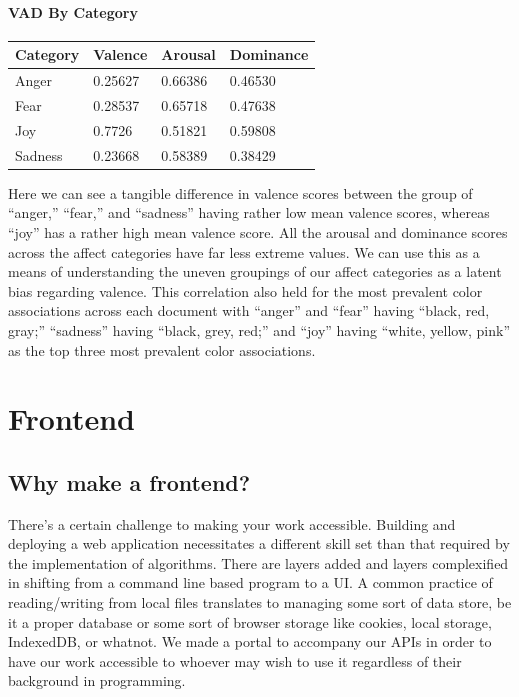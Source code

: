 \documentclass[11pt, twoside, reqno]{book}
\begin{document}
\subsubsection{\textbf{VAD By Category}}

\begin{table}[h!]
    \raggedright
    \begin{tabular}{|l|l|l|l|}
    \hline
        Category & Valence & Arousal & Dominance \\ \hline
        Anger & 0.25627 & 0.66386 & 0.46530 \\ \hline
        Fear & 0.28537 & 0.65718 & 0.47638 \\ \hline
        Joy & 0.7726 & 0.51821 & 0.59808 \\ \hline
        Sadness & 0.23668 & 0.58389 & 0.38429 \\ \hline
    \end{tabular}
\end{table}

Here we can see a tangible difference in valence scores between the group of ``anger,'' ``fear,'' and ``sadness'' having rather low mean valence scores, whereas ``joy'' has a rather high mean valence score. All the arousal and dominance scores across the affect categories have far less extreme values. We can use this as a means of understanding the uneven groupings of our affect categories as a latent bias regarding valence. This correlation also held for the most prevalent color associations across each document with ``anger'' and ``fear'' having ``black, red, gray;'' ``sadness'' having ``black, grey, red;'' and ``joy'' having ``white, yellow, pink'' as the top three most prevalent color associations.









\chapter{Frontend}

\section{Why make a frontend?}

There's a certain challenge to making your work accessible. Building and deploying a web application necessitates a different skill set than that required by the implementation of algorithms. There are layers added and layers complexified in shifting from a command line based program to a UI. A common practice of reading/writing from local files translates to managing some sort of data store, be it a proper database or some sort of browser storage like cookies, local storage, IndexedDB, or whatnot. We made a portal to accompany our APIs in order to have our work accessible to whoever may wish to use it regardless of their background in programming.
\end{document}
